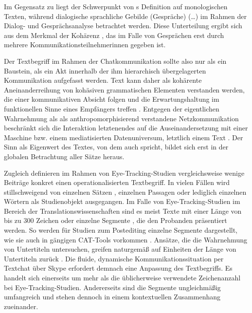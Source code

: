 Im Gegensatz zu \citeauthor{beiswenger_sprachhandlungskoordination_2007} liegt der Schwerpunkt von \citeauthor{brinker_text-_2001}s Definition auf monologischen Texten, während \glqq dialogische sprachliche Gebilde (Gespräche) (\dots)\grqq{} \citep[17]{brinker_text-_2001} im Rahmen der Dialog- und Gesprächsanalyse betrachtet werden. Diese Unterteilung ergibt sich aus dem \glqq Merkmal der Kohärenz\grqq{} \citep[12]{brinker_text-_2001}, das im Falle von Gesprächen erst durch mehrere Kommunikationsteilnehmer{\textperiodcentered}innen gegeben ist.

Der Textbegriff im Rahmen der Chatkommunikation sollte also nur als ein Baustein, als ein Akt innerhalb der ihm hierarchisch übergelagerten Kommunikation aufgefasst werden. Text kann daher als kohärente Aneinanderreihung von kohäsiven grammatischen Elementen verstanden werden, die einer kommunikativen Absicht folgen und die Erwartungshaltung im funktionellen Sinne eines Empfängers treffen \citep[1187]{busmann_routledge_1998}. Entgegen der eigentlichen Wahrnehmung als als \glqq anthropomorphisierend\grqq{} \citep[7]{beck_computervermittelte_2006} verstandene Netzkommunikation beschränkt sich die Interaktion letztenendes auf die Auseinandersetzung \glqq mit einer Maschine bzw. einem mediatisierten Datenuniversum, letztlich einem Text\grqq{} \citep[7]{beck_computervermittelte_2006}. Der Sinn als Eigenwert des Textes, von dem auch \citet[184\psqq]{coseriu_kontrastive_1988} spricht, bildet sich erst in der globalen Betrachtung aller Sätze heraus.

Zugleich definieren im Rahmen von Eye-Tracking-Studien vergleichsweise wenige Beiträge konkret einen operationalisierten Textbegriff. In vielen Fällen wird stillschweigend von einzelnen Sätzen \citep[]{rayner_eye_2003}, einzelnen Passagen oder lediglich einzelnen Wörtern als Studienobjekt ausgegangen. Im Falle von Eye-Tracking-Studien im Bereich der Translationswissenschaften sind es meist Texte mit einer Länge von bis zu 300 Zeichen \citep[]{lykke_jakobsen_eye_2008} oder einzelne Segmente \citep[]{jakobsen_reading_2017}, die den Probanden präsentiert werden. So werden für Studien zum Postediting einzelne Segmente dargestellt, wie sie auch in gängigen CAT-Tools vorkommen \citep[]{jakobsen_reading_2017, vardaro_translation_2019}. Ansätze, die die Wahrnehmung von Untertiteln untersuchen, greifen naturgemäß auf Einheiten der Länge von Untertiteln zurück \citep[]{bisson_processing_2014, fox_can_2018, kruger_multimodal_2018}. Die fluide, dynamische Kommunikationssituation per Textchat über Skype erfordert demnach eine Anpassung des Textbegriffs. Es handelt sich einerseits um mehr als die üblicherweise verwendete Zeichenanzahl bei Eye-Tracking-Studien. Andererseits sind die Segmente ungleichmäßig umfangreich und stehen dennoch in einem kontextuellen Zusammenhang zueinander.

